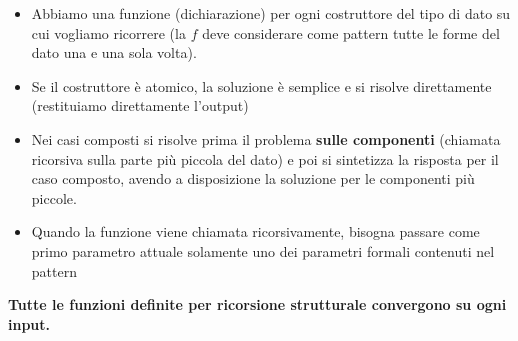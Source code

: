 \documentclass[
  a4paper,
]{article}
\providecommand{\tightlist}{%
  \setlength{\itemsep}{0pt}\setlength{\parskip}{0pt}}
\begin{document}
\begin{itemize}
\tightlist
\item
  Abbiamo una funzione (dichiarazione) per ogni costruttore del tipo di
  dato su cui vogliamo ricorrere (la \(f\) deve considerare come pattern
  tutte le forme del dato una e una sola volta).
\item
  Se il costruttore è atomico, la soluzione è semplice e si risolve
  direttamente (restituiamo direttamente l'output)
\item
  Nei casi composti si risolve prima il problema \textbf{sulle
  componenti} (chiamata ricorsiva sulla parte più piccola del dato) e
  poi si sintetizza la risposta per il caso composto, avendo a
  disposizione la soluzione per le componenti più piccole.
\item
  Quando la funzione viene chiamata ricorsivamente, bisogna passare come
  primo parametro attuale solamente uno dei parametri formali contenuti
  nel pattern
\end{itemize}

\begin{examplebox}[Teorema]

\textbf{Tutte le funzioni definite per ricorsione strutturale convergono
su ogni input.}

\end{examplebox}
\end{document}

